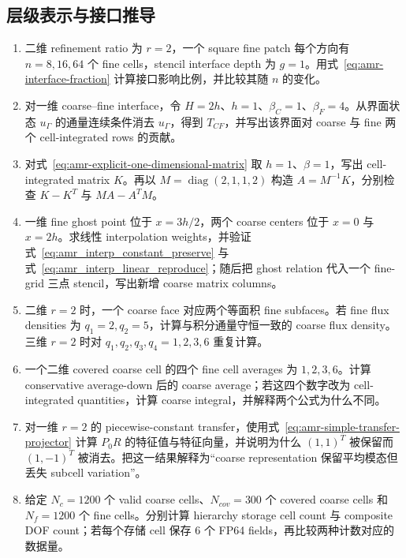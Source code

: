\subsection*{层级表示与接口推导}
\begin{enumerate}[label=\arabic*.]
\item 二维 refinement ratio 为 $r=2$，一个 square fine patch 每个方向有 $n=8,16,64$ 个 fine cells，stencil interface depth 为 $g=1$。用式~\eqref{eq:amr-interface-fraction} 计算接口影响比例，并比较其随 $n$ 的变化。
\item 对一维 coarse--fine interface，令 $H=2h$、$h=1$、$\beta_C=1$、$\beta_F=4$。从界面状态 $u_\Gamma$ 的通量连续条件消去 $u_\Gamma$，得到 $T_{CF}$，并写出该界面对 coarse 与 fine 两个 cell-integrated rows 的贡献。
\item 对式~\eqref{eq:amr-explicit-one-dimensional-matrix} 取 $h=1$、$\beta=1$，写出 cell-integrated matrix $K$。再以 $M=\operatorname{diag}(2,1,1,2)$ 构造 $A=M^{-1}K$，分别检查 $K-K^T$ 与 $MA-A^TM$。
\item 一维 fine ghost point 位于 $x=3h/2$，两个 coarse centers 位于 $x=0$ 与 $x=2h$。求线性 interpolation weights，并验证式~\eqref{eq:amr_interp_constant_preserve} 与式~\eqref{eq:amr_interp_linear_reproduce}；随后把 ghost relation 代入一个 fine-grid 三点 stencil，写出新增 coarse matrix columns。
\item 二维 $r=2$ 时，一个 coarse face 对应两个等面积 fine subfaces。若 fine flux densities 为 $q_1=2,q_2=5$，计算与积分通量守恒一致的 coarse flux density。三维 $r=2$ 时对 $q_1,q_2,q_3,q_4=1,2,3,6$ 重复计算。
\item 一个二维 covered coarse cell 的四个 fine cell averages 为 $1,2,3,6$。计算 conservative average-down 后的 coarse average；若这四个数字改为 cell-integrated quantities，计算 coarse integral，并解释两个公式为什么不同。
\item 对一维 $r=2$ 的 piecewise-constant transfer，使用式~\eqref{eq:amr-simple-transfer-projector} 计算 $P_0R$ 的特征值与特征向量，并说明为什么 $(1,1)^T$ 被保留而 $(1,-1)^T$ 被消去。把这一结果解释为“coarse representation 保留平均模态但丢失 subcell variation”。
\item 给定 $N_c=1200$ 个 valid coarse cells、$N_{cov}=300$ 个 covered coarse cells 和 $N_f=1200$ 个 fine cells。分别计算 hierarchy storage cell count 与 composite DOF count；若每个存储 cell 保存 6 个 FP64 fields，再比较两种计数对应的数据量。


\end{enumerate}
